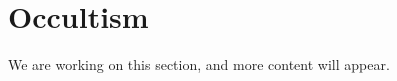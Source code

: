 \section{Occultism}

\begin{publictodo}We are working on this section, and more content will appear.\end{publictodo}



\devel{}
